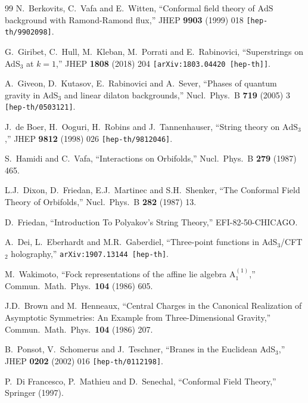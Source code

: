 \documentclass[12pt,a4paper]{article}
\begin{document}
\begin{thebibliography}{99}
N.~Berkovits, C.~Vafa and E.~Witten,
``Conformal field theory of $\mathrm{AdS}$ background with Ramond-Ramond flux,''
JHEP {\bf 9903} (1999) 018
{\tt [hep-th/9902098]}.   

G.~Giribet, C.~Hull, M.~Kleban, M.~Porrati and E.~Rabinovici,
``Superstrings on AdS$_{3}$ at $k=1$,''
JHEP {\bf 1808} (2018) 204
{\tt [arXiv:1803.04420 [hep-th]]}.  

A.~Giveon, D.~Kutasov, E.~Rabinovici and A.~Sever,
``Phases of quantum gravity in AdS$_3$ and linear dilaton backgrounds,''
Nucl.\ Phys.\ B {\bf 719} (2005) 3
{\tt [hep-th/0503121]}.

J.~de Boer, H.~Ooguri, H.~Robins and J.~Tannenhauser,
``String theory on $\mathrm{AdS}_3$,''
JHEP {\bf 9812} (1998) 026
{\tt [hep-th/9812046]}.  

  S.~Hamidi and C.~Vafa,
  ``Interactions on Orbifolds,''
  Nucl.\ Phys.\ B {\bf 279} (1987) 465.
  
L.J.~Dixon, D.~Friedan, E.J.~Martinec and S.H.~Shenker,
``The Conformal Field Theory of Orbifolds,''
Nucl.\ Phys.\ B {\bf 282} (1987) 13.

D.~Friedan,
``Introduction To Polyakov's String Theory,''
EFI-82-50-CHICAGO.

A.~Dei, L.~Eberhardt and M.R.~Gaberdiel,
``Three-point functions in AdS$_3$/CFT$_2$ holography,''
{\tt arXiv:1907.13144 [hep-th]}.

  M.~Wakimoto,
  ``Fock representations of the affine lie algebra $\text{A}_1^{(1)}$,''
  Commun.\ Math.\ Phys.\  {\bf 104} (1986) 605.

J.D.~Brown and M.~Henneaux,
``Central Charges in the Canonical Realization of Asymptotic Symmetries: An Example from Three-Dimensional Gravity,''
Commun.\ Math.\ Phys.\  {\bf 104} (1986) 207.

B.~Ponsot, V.~Schomerus and J.~Teschner,
``Branes in the Euclidean AdS$_3$,''
JHEP {\bf 0202} (2002) 016
{\tt  [hep-th/0112198]}.

P.~Di Francesco, P.~Mathieu and D.~Senechal,
``Conformal Field Theory,'' Springer (1997).


\end{thebibliography}
\end{document}
